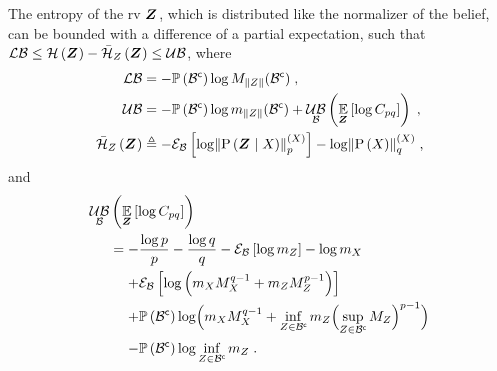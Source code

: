 \begin{proposition}
	\label{thm:normalizer_bounds}
	The entropy of the \gls{rv} $\boldsymbol Z_{}$, which is distributed like the normalizer of the belief, can be bounded with a difference of a partial expectation, such that $\operatorname*{\mathcal{LB}}\leq\mathcal{H}\left({\boldsymbol Z_{}}\right) -\bar{\mathcal{H}}_{Z_{}}\left({\boldsymbol Z_{}}\right)\leq\operatorname*{\mathcal{UB}}$, where
	\begin{subequations}
		\begin{align}
			\lowerbound & =-\measure{\stcomp{\subSpace}}\log M_{\norm{\observations{}}}(\stcomp{\subSpace})\;,                                                                      \\
			\upperbound & =-\measure{\stcomp{\subSpace}}\log m_{\norm{\observations{}}}(\stcomp{\subSpace})+\upperbound_\subSpace\left(\expectation{\log C_{pq}}{\observationsRV{}}\right)\;,\\
			\simplentropy{\observationsRV{}}{\observations{}}&\triangleq-\partialexpectation{\log\pnorm{\probcond{\observationsRV{}}{\states{}}}{p}{\states{}}}{\subSpace}-\log\pnorm{\prob{\states{}}}{q}{\states{}}\;,
		\end{align}
	\end{subequations}
	and
	\begin{equation}
		\begin{split}
			\upperbound_\subSpace&\left(\expectation{\log C_{pq}}{\observationsRV{}}\right)                                                                                                                                                       \\
			&=-\frac{\log p}{p}-\frac{\log q}{q}-\partialexpectation{\log m_{\observations{}}}{\subSpace}-\log m_{\states{}}                                                                                                      \\
			&\phantomeq+ \partialexpectation{\log\left(m_{\states{}}M_{\states{}}^{q-1}+m_{\observations{}}M_{\observations{}}^{p-1}\right)}{\subSpace}                                                                           \\
			&\phantomeq+\measure{\stcomp{\subSpace}}\log\Bigl( m_{\states{}}M_{\states{}}^{q-1}+\inf_{\observations{}\in\stcomp{\subSpace}}m_{\observations{}}\Bigl(\sup_{\observations{}\in\stcomp{\subSpace}}M_{\observations{}}\Bigr)^{p-1}\Bigr) \\
			&\phantomeq-\measure{\stcomp{\subSpace}}\log\inf_{\observations{}\in\stcomp{\subSpace}}m_{\observations{}}\;.
		\end{split}
	\end{equation}
\end{proposition}
